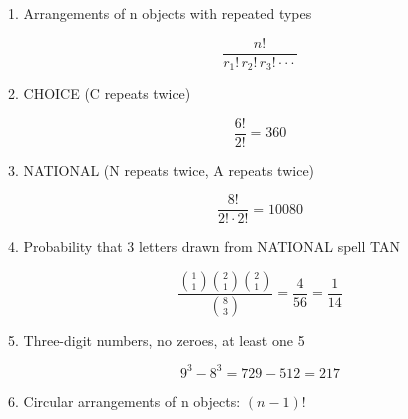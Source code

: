 1. Arrangements of n objects with repeated types

$$ \frac{n!}{r_1! \, r_2! \, r_3! \cdot\cdot\cdot} $$

2. CHOICE (C repeats twice)

$$ \frac{6!}{2!} = 360 $$

3. NATIONAL (N repeats twice, A repeats twice)

$$ \frac{8!}{2! \cdot 2!} = 10080 $$

4. Probability that 3 letters drawn from NATIONAL spell TAN

$$ \frac{\binom{1}{1} \binom{2}{1} \binom{2}{1}}{\binom{8}{3}} = \frac{4}{56} = \frac{1}{14} $$

5. Three-digit numbers, no zeroes, at least one 5

$$ 9^3 - 8^3 = 729 - 512 = 217 $$

6. Circular arrangements of n objects: $(n-1)!$
